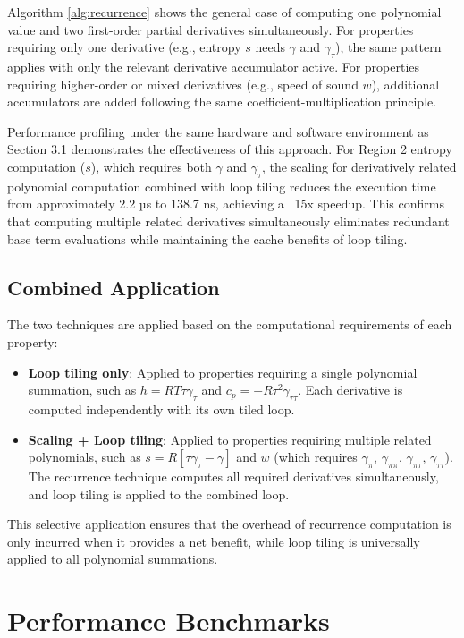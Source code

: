 \documentclass{article}
\begin{document}
Algorithm \ref{alg:recurrence} shows the general case of computing one polynomial value and two first-order partial derivatives simultaneously. For properties requiring only one derivative (e.g., entropy $s$ needs $\gamma$ and $\gamma_\tau$), the same pattern applies with only the relevant derivative accumulator active. For properties requiring higher-order or mixed derivatives (e.g., speed of sound $w$), additional accumulators are added following the same coefficient-multiplication principle.

Performance profiling under the same hardware and software environment as 
Section 3.1 demonstrates the effectiveness of this approach. 
For Region 2 entropy computation ($s$), which requires both $\gamma$ and $\gamma_\tau$,
the scaling for derivatively related polynomial computation combined with loop tiling reduces the execution time from approximately 2.2 µs to 138.7 ns, achieving a ~15x speedup. This confirms that computing multiple related derivatives simultaneously eliminates redundant base term evaluations while maintaining the cache benefits of loop tiling.

\subsection{Combined Application}

The two techniques are applied based on the computational requirements of each property:

\begin{itemize}
    \item \textbf{Loop tiling only}: Applied to properties requiring a single polynomial summation, such as $h = RT\tau\gamma_\tau$ and $c_p = -R\tau^2\gamma_{\tau\tau}$. Each derivative is computed independently with its own tiled loop.
    \item \textbf{Scaling + Loop tiling}: Applied to properties requiring multiple related polynomials, such as $s = R[\tau\gamma_\tau - \gamma]$ and $w$ (which requires $\gamma_\pi$, $\gamma_{\pi\pi}$, $\gamma_{\pi\tau}$, $\gamma_{\tau\tau}$). The recurrence technique computes all required derivatives simultaneously, and loop tiling is applied to the combined loop.
\end{itemize}

This selective application ensures that the overhead of recurrence computation is only incurred when it provides a net benefit, while loop tiling is universally applied to all polynomial summations.

\section{Performance Benchmarks}
\end{document}
